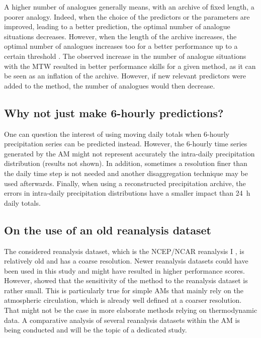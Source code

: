 \documentclass[hess, manuscript]{copernicus}
\begin{document}
	A higher number of analogues generally means, with an archive of fixed length, a poorer analogy. Indeed, when the choice of the predictors or the parameters are improved, leading to a better prediction, the optimal number of analogue situations decreases. However, when the length of the archive increases, the optimal number of analogues increases too for a better performance up to a certain threshold \citep[][]{Bontron2004, Hamill2006a }. The observed increase in the number of analogue situations with the MTW resulted in better performance skills for a given method, as it can be seen as an inflation of the archive. However, if new relevant predictors were added to the method, the number of analogues would then decrease.
	
	
	\subsection{Why not just make 6-hourly predictions?}
	
	One can question the interest of using moving daily totals when 6-hourly precipitation series can be predicted instead. However, the 6-hourly time series generated by the AM might not represent accurately the intra-daily precipitation distribution (results not shown). In addition, sometimes a resolution finer than the daily time step is not needed and another disaggregation technique may be used afterwards. Finally, when using a reconstructed precipitation archive, the errors in intra-daily precipitation distributions have a smaller impact than 24~h daily totals.
	
	
	\subsection{On the use of an old reanalysis dataset}
	\label{sec:old_reanalysis}
	
	The considered reanalysis dataset, which is the NCEP/NCAR reanalysis I \citep{Kalnay1996}, is relatively old and has a coarse resolution. Newer reanalysis datasets could have been used in this study and might have resulted in higher performance scores. However, \cite{BenDaoud2009} showed that the sensitivity of the method to the reanalysis dataset is rather small. This is particularly true for simple AMs that mainly rely on the atmospheric circulation, which is already well defined at a coarser resolution. That might not be the case in more elaborate methods relying on thermodynamic data. A comparative analysis of several reanalysis datasets within the AM is being conducted and will be the topic of a dedicated study.
	
\end{document}
